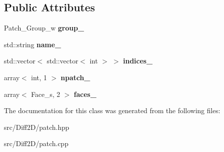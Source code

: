 \subsection*{Public Attributes}
\begin{DoxyCompactItemize}
\item 
\hypertarget{classPatch_a93fff2891647c4109c16cb4ec2079545}{Patch\-\_\-\-Group\-\_\-w {\bfseries group\-\_\-}}\label{classPatch_a93fff2891647c4109c16cb4ec2079545}

\item 
\hypertarget{classPatch_a133d268d88897aef8b20ca7da98b9cdb}{std\-::string {\bfseries name\-\_\-}}\label{classPatch_a133d268d88897aef8b20ca7da98b9cdb}

\item 
\hypertarget{classPatch_a9cf37e5da9a803692c4ad575ec3ffbb1}{std\-::vector$<$ std\-::vector$<$ int $>$ $>$ {\bfseries indices\-\_\-}}\label{classPatch_a9cf37e5da9a803692c4ad575ec3ffbb1}

\item 
\hypertarget{classPatch_a41ac7ad621e3c8c93014e96050985990}{array$<$ int, 1 $>$ {\bfseries npatch\-\_\-}}\label{classPatch_a41ac7ad621e3c8c93014e96050985990}

\item 
\hypertarget{classPatch_a6d0bbabb9b7b1928bda12255b312fedd}{array$<$ Face\-\_\-s, 2 $>$ {\bfseries faces\-\_\-}}\label{classPatch_a6d0bbabb9b7b1928bda12255b312fedd}

\end{DoxyCompactItemize}


The documentation for this class was generated from the following files\-:\begin{DoxyCompactItemize}
\item 
src/\-Diff2\-D/patch.\-hpp\item 
src/\-Diff2\-D/patch.\-cpp\end{DoxyCompactItemize}
